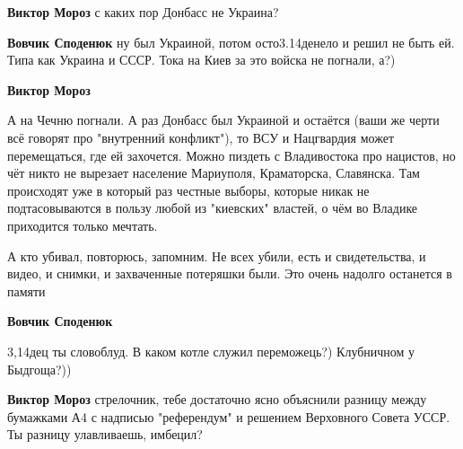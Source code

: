 \begin{itemize}
\begin{itemize}
\textbf{Виктор Мороз} с каких пор Донбасс не Украина?

 
\textbf{Вовчик Споденюк} ну был Украиной, потом осто3.14денело и решил не быть
ей. Типа как Украина и СССР. Тока на Киев за это войска не погнали, а?)

 
\textbf{Виктор Мороз} 

А на Чечню погнали. А раз Донбасс был Украиной и остаётся (ваши же черти всё
говорят про "внутренний конфликт"), то ВСУ и Нацгвардия может перемещаться, где
ей захочется. Можно пиздеть с Владивостока про нацистов, но чёт никто не
вырезает население Мариуполя, Краматорска, Славянска. Там происходят уже в
который раз честные выборы, которые никак не подтасовываются в пользу любой из
"киевских" властей, о чём во Владике приходится только мечтать.

А кто убивал, повторюсь, запомним. Не всех убили, есть и свидетельства, и
видео, и снимки, и захваченные потеряшки были. Это очень надолго останется в
памяти


 
\textbf{Вовчик Споденюк} 

3,14дец ты словоблуд. В каком котле служил переможець?) Клубничном у Быдгоща?))


 
\textbf{Виктор Мороз} стрелочник, тебе достаточно ясно объяснили разницу между
бумажками А4 с надписью "референдум" и решением Верховного Совета УССР. Ты
разницу улавливаешь, имбецил?


\end{itemize}
\end{itemize}

